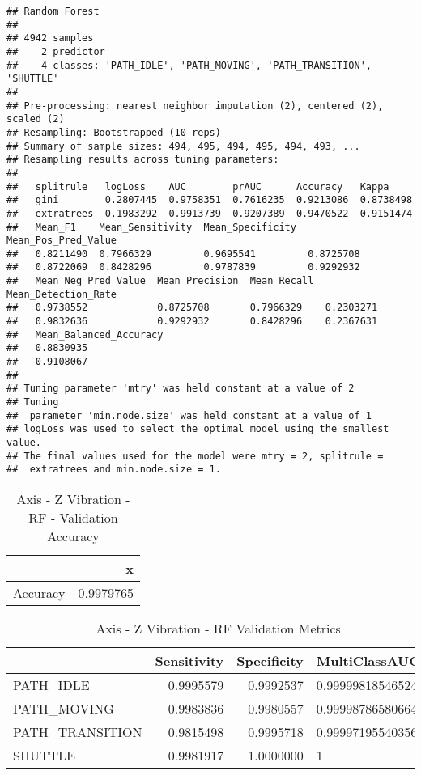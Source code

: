 \documentclass[]{article}
\begin{document}
\begin{verbatim}
## Random Forest 
## 
## 4942 samples
##    2 predictor
##    4 classes: 'PATH_IDLE', 'PATH_MOVING', 'PATH_TRANSITION', 'SHUTTLE' 
## 
## Pre-processing: nearest neighbor imputation (2), centered (2), scaled (2) 
## Resampling: Bootstrapped (10 reps) 
## Summary of sample sizes: 494, 495, 494, 495, 494, 493, ... 
## Resampling results across tuning parameters:
## 
##   splitrule   logLoss    AUC        prAUC      Accuracy   Kappa    
##   gini        0.2807445  0.9758351  0.7616235  0.9213086  0.8738498
##   extratrees  0.1983292  0.9913739  0.9207389  0.9470522  0.9151474
##   Mean_F1    Mean_Sensitivity  Mean_Specificity  Mean_Pos_Pred_Value
##   0.8211490  0.7966329         0.9695541         0.8725708          
##   0.8722069  0.8428296         0.9787839         0.9292932          
##   Mean_Neg_Pred_Value  Mean_Precision  Mean_Recall  Mean_Detection_Rate
##   0.9738552            0.8725708       0.7966329    0.2303271          
##   0.9832636            0.9292932       0.8428296    0.2367631          
##   Mean_Balanced_Accuracy
##   0.8830935             
##   0.9108067             
## 
## Tuning parameter 'mtry' was held constant at a value of 2
## Tuning
##  parameter 'min.node.size' was held constant at a value of 1
## logLoss was used to select the optimal model using the smallest value.
## The final values used for the model were mtry = 2, splitrule =
##  extratrees and min.node.size = 1.
\end{verbatim}

\begin{table}[!h]

\caption{\label{tab:sensor-z-vib-rf-results}Axis - Z Vibration - RF - Validation Accuracy}
\centering
\begin{tabular}[t]{lr}
\toprule
  & x\\
\midrule
Accuracy & 0.9979765\\
\bottomrule
\end{tabular}
\end{table}

\begin{table}[!h]

\caption{\label{tab:sensor-z-vib-rf-results}Axis - Z Vibration - RF Validation Metrics}
\centering
\begin{tabular}[t]{lrrl}
\toprule
  & Sensitivity & Specificity & MultiClassAUC\\
\midrule
PATH\_IDLE & 0.9995579 & 0.9992537 & 0.999998185465247\\
PATH\_MOVING & 0.9983836 & 0.9980557 & 0.999987865806646\\
PATH\_TRANSITION & 0.9815498 & 0.9995718 & 0.999971955403562\\
SHUTTLE & 0.9981917 & 1.0000000 & 1\\
\bottomrule
\end{tabular}
\end{table}
\end{document}
